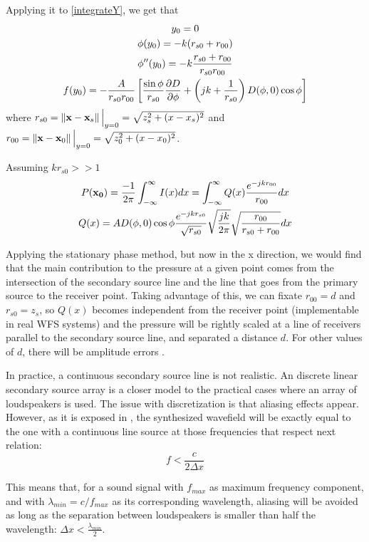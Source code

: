 Applying it to \autoref{integrateY}, we get that
\begin{gather}
	y_0 = 0 \\
	\phi(y_0) = -k(r_{s0} + r_{00}) \\
	\phi''(y_0) = -k\frac{r_{s0} + r_{00}}{r_{s0} r_{00}} \\
	f(y_0) = -\frac{A}{r_{s0} r_{00}}\left[ \frac{\sin\phi}{r_{s0}} \frac{\partial\Diag}{\partial\phi} + \left(jk + \frac{1}{r_{s0}}\right) \Diag(\phi, 0) \cos\phi \right]
\end{gather}
where $r_{s0} = \left\| \mathbf{x} - \mathbf{x}_s \right\|\Big\vert_{y = 0} = \sqrt{z_s^2 + (x - x_s)^2}$ and $r_{00} = \left\| \mathbf{x} - \mathbf{x}_0 \right\|\Big\vert_{y = 0} = \sqrt{z_0^2 + (x - x_0)^2}$.

Assuming $kr_{s0} >> 1$
\begin{gather}
P(\vec{x_0}) = \frac{-1}{2\pi} \int_{-\infty}^{\infty} I(x) dx = \int_{-\infty}^{\infty} Q(x) \frac{e^{-jkr_{00}}}{r_{00}} dx \label{RaileighI2.5}\\ 
Q(x) = A \Diag(\phi, 0) \cos\phi \frac{e^{-jk r_{s0}}}{\sqrt{r_{s0}}} \sqrt{\frac{jk}{2\pi}} \sqrt{\frac{r_{00}}{r_{s0} + r_{00}}} dx
\end{gather}

Applying the stationary phase method, but now in the x direction, we would find that the main contribution to the pressure at a given point comes from the intersection of the secondary source line and the line that goes from the primary source to the receiver point. Taking advantage of this, we can fixate $r_{00} = d$ and $r_{s0} = z_s$, so $Q(x)$ becomes independent from the receiver point (implementable in real WFS systems) and the pressure will be rightly scaled at a line of receivers parallel to the secondary source line, and separated a distance $d$. For other values of $d$, there will be amplitude errors \cite{Verheijen}.

In practice, a continuous secondary source line is not realistic. An discrete linear secondary source array is a closer model to the practical cases where an array of loudspeakers is used. The issue with discretization is that aliasing effects appear. However, as it is exposed in \cite{Start1997}, the synthesized wavefield will be exactly equal to the one with a continuous line source at those frequencies that respect next relation:
\begin{equation}
f < \frac{c}{2\Delta x}
\end{equation}

This means that, for a sound signal with $f_{max}$ as maximum frequency component, and with $\lambda_{min} = c/f_{max}$ as its corresponding wavelength, aliasing will be avoided as long as the separation between loudspeakers is smaller than half the wavelength: $\Delta x < \frac{\lambda_{min}}{2}$.

